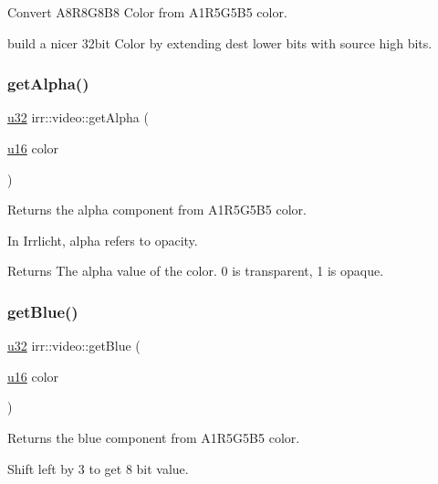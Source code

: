 Convert A8\+R8\+G8\+B8 Color from A1\+R5\+G5\+B5 color. 

build a nicer 32bit Color by extending dest lower bits with source high bits. \mbox{\label{namespaceirr_1_1video_a23358b142a005c4a4c747d227a4d77ab}} 
\subsubsection{\texorpdfstring{get\+Alpha()}{getAlpha()}}
{\footnotesize\ttfamily \hyperlink{namespaceirr_a0416a53257075833e7002efd0a18e804}{u32} irr\+::video\+::get\+Alpha (\begin{DoxyParamCaption}\item[{\hyperlink{namespaceirr_ae9f8ec82692ad3b83c21f555bfa70bcc}{u16}}]{color }\end{DoxyParamCaption})\hspace{0.3cm}{\ttfamily [inline]}}



Returns the alpha component from A1\+R5\+G5\+B5 color. 

In Irrlicht, alpha refers to opacity. \begin{DoxyReturn}{Returns}
The alpha value of the color. 0 is transparent, 1 is opaque. 
\end{DoxyReturn}
\mbox{\label{namespaceirr_1_1video_ae8dc9edd5a3eb01de47933ac2d7f679e}} 
\subsubsection{\texorpdfstring{get\+Blue()}{getBlue()}}
{\footnotesize\ttfamily \hyperlink{namespaceirr_a0416a53257075833e7002efd0a18e804}{u32} irr\+::video\+::get\+Blue (\begin{DoxyParamCaption}\item[{\hyperlink{namespaceirr_ae9f8ec82692ad3b83c21f555bfa70bcc}{u16}}]{color }\end{DoxyParamCaption})\hspace{0.3cm}{\ttfamily [inline]}}



Returns the blue component from A1\+R5\+G5\+B5 color. 

Shift left by 3 to get 8 bit value. \mbox{\label{namespaceirr_1_1video_a3e64185c36326ed33a494ba14cac00a5}} 
